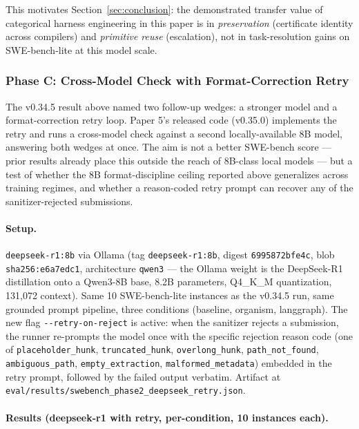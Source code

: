 This motivates Section~\ref{sec:conclusion}: the demonstrated transfer value of categorical harness engineering in this paper is in \emph{preservation} (certificate identity across compilers) and \emph{primitive reuse} (escalation), not in task-resolution gains on SWE-bench-lite at this model scale.

\subsubsection{Phase C: Cross-Model Check with Format-Correction Retry}
\label{sec:swebench-phase-c}

The v0.34.5 result above named two follow-up wedges: a stronger model and a format-correction retry loop. Paper 5's released code (v0.35.0) implements the retry and runs a cross-model check against a second locally-available 8B model, answering both wedges at once. The aim is not a better SWE-bench score --- prior results already place this outside the reach of 8B-class local models --- but a test of whether the 8B format-discipline ceiling reported above generalizes across training regimes, and whether a reason-coded retry prompt can recover any of the sanitizer-rejected submissions.

\paragraph{Setup.} \texttt{deepseek-r1:8b} via Ollama (tag \texttt{deepseek-r1:8b}, digest \texttt{6995872bfe4c}, blob \texttt{sha256:e6a7edc1}, architecture \texttt{qwen3} --- the Ollama weight is the DeepSeek-R1 distillation onto a Qwen3-8B base, 8.2B parameters, Q4\_K\_M quantization, 131{,}072 context). Same 10 SWE-bench-lite instances as the v0.34.5 run, same grounded prompt pipeline, three conditions (baseline, organism, langgraph). The new flag \texttt{-{}-retry-on-reject} is active: when the sanitizer rejects a submission, the runner re-prompts the model once with the specific rejection reason code (one of \texttt{placeholder\_hunk}, \texttt{truncated\_hunk}, \texttt{overlong\_hunk}, \texttt{path\_not\_found}, \texttt{ambiguous\_path}, \texttt{empty\_extraction}, \texttt{malformed\_metadata}) embedded in the retry prompt, followed by the failed output verbatim. Artifact at \texttt{eval/results/swebench\_phase2\_deepseek\_retry.json}.

\paragraph{Results (deepseek-r1 with retry, per-condition, 10 instances each).}

